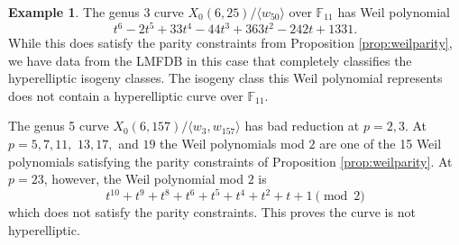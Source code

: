 \documentclass[12pt]{amsart}
\newcommand{\F}{\mathbb{F}}
\numberwithin{equation}{subsection}
\theoremstyle{plain}\newtheorem{ithm}{Theorem}
\theoremstyle{plain}\newtheorem{iprop}[ithm]{Proposition}
\theoremstyle{definition}
\newtheorem{example}[equation]{Example}
\theoremstyle{remark}
\newcommand{\Curve}[2]{X_0({#1},{#2})} %
\begin{document}
\begin{example}
The genus 3 curve $\Curve{6}{25}/\langle w_{50} \rangle$ over $\F_{11}$ has Weil polynomial
\[t^6 - 2t^5 + 33t^4 - 44t^3 + 363t^2 - 242t + 1331.\]
While this does satisfy the parity constraints from Proposition \ref{prop:weilparity}, we have data from the LMFDB in this case that completely classifies the hyperelliptic isogeny classes. The isogeny class this Weil polynomial represents does not contain a  hyperelliptic curve over $\F_{11}$.

The genus 5 curve $\Curve{6}{157}/\langle w_3, w_{157} \rangle $ has bad reduction at $p = 2,3$. At $p = 5,7, 11,$ $13, 17,$ and $19$ the Weil polynomials mod $2$ are one of the 15 Weil polynomials satisfying the parity constraints of Proposition \ref{prop:weilparity}. At $p = 23$, however, the Weil  polynomial mod $2$ is
\[t^{10} + t^9 + t^8 + t^6 + t^5 + t^4 + t^2 + t + 1 \pmod 2\]
which does not satisfy the parity constraints. This proves the curve is not hyperelliptic.
\end{example}

\end{document}
